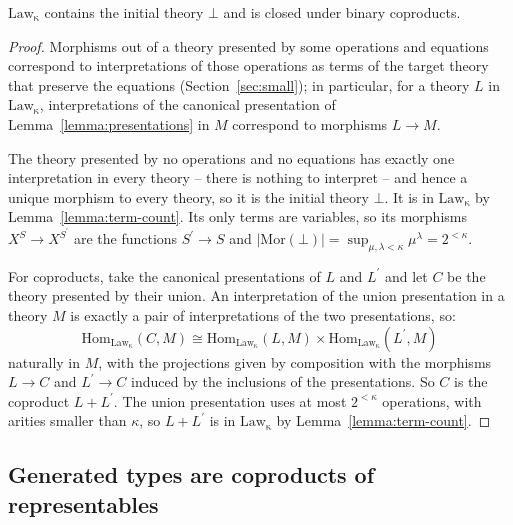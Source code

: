 \documentclass[acmsmall, screen, review, anonymous]{acmart}
\theoremstyle{definition}
\newcommand{\arr}{\rightarrow}
\newcommand{\initial}{\bot}
\newcommand{\lawc}{\mathrm{Law_{\kappa}}}
\newcommand{\homset}[3]{\mathrm{Hom}_{#1}(#2, #3)}
\begin{document}
\begin{lemma}
\label{lemma:law-closure}
  $\lawc$ contains the initial theory $\initial$ and is closed under
  binary coproducts.
\end{lemma}
\begin{proof}
  Morphisms out of a theory presented by some operations and equations
  correspond to interpretations of those operations as terms of the
  target theory that preserve the equations
  (Section~\ref{sec:small}); in particular, for a theory $L$ in
  $\lawc$, interpretations of the canonical presentation of
  Lemma~\ref{lemma:presentations} in $M$ correspond to morphisms
  $L \arr M$.

  The theory presented by no operations and no equations has exactly
  one interpretation in every theory -- there is nothing to interpret
  -- and hence a unique morphism to every theory, so it is the initial
  theory $\initial$. It is in $\lawc$ by
  Lemma~\ref{lemma:term-count}. Its only terms are variables, so its
  morphisms $X^S \arr X^{S^\prime}$ are the functions
  $S^\prime \arr S$ and
  $|\mathrm{Mor}(\initial)| = \sup_{\mu, \lambda < \kappa}
  \mu^{\lambda} = 2^{<\kappa}$.

  For coproducts, take the canonical presentations of $L$ and
  $L^\prime$ and let $C$ be the theory presented by their union. An
  interpretation of the union presentation in a theory $M$ is exactly
  a pair of interpretations of the two presentations, so:
  \begin{equation*}
    \homset{\lawc}{C}{M} \cong
    \homset{\lawc}{L}{M} \times \homset{\lawc}{L^\prime}{M}
  \end{equation*}
  naturally in $M$, with the projections given by composition with the
  morphisms $L \arr C$ and $L^\prime \arr C$ induced by the inclusions
  of the presentations. So $C$ is the coproduct $L + L^\prime$. The
  union presentation uses at most $2^{<\kappa}$ operations, with
  arities smaller than $\kappa$, so $L + L^\prime$ is in $\lawc$ by
  Lemma~\ref{lemma:term-count}.
\end{proof}

\subsection{Generated types are coproducts of representables}
\label{apdx:generated}
\end{document}
